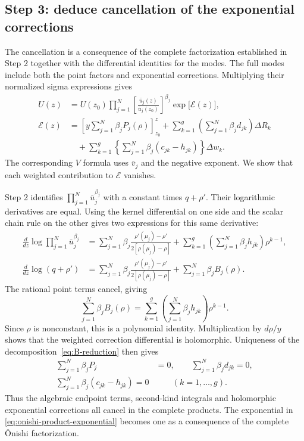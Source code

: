 \documentclass[11pt]{article}
\begin{document}
\subsection{Step 3: deduce cancellation of the exponential corrections}

The cancellation is a consequence of the complete factorization established in Step 2 together with the differential identities for the modes. The full modes include both the point factors and exponential corrections. Multiplying their normalized sigma expressions gives
\begin{equation}\label{eq:onishi-product-exponential}
\begin{aligned}
U(z)&=U(z_0)\prod_{j=1}^{N}\left[\frac{\bar u_j(z)}{\bar u_j(z_0)}\right]^{\beta_j}\exp\bigl[\mathcal E(z)\bigr],\\
\mathcal E(z)&=\left[y\sum_{j=1}^{N}\beta_jP_j(\rho)\right]_{z_0}^z
+\sum_{k=1}^g\left(\sum_{j=1}^{N}\beta_jd_{jk}\right)\Delta R_k\\
&\quad+\sum_{k=1}^g\left\{\sum_{j=1}^{N}\beta_j(c_{jk}-h_{jk})\right\}\Delta w_k.
\end{aligned}
\end{equation}
The corresponding $V$ formula uses $\bar v_j$ and the negative exponent. We show that each weighted contribution to $\mathcal E$ vanishes.

Step 2 identifies $\prod_{j=1}^{N}\bar u_j^{\beta_j}$ with a constant times $q+\rho'$. Their logarithmic derivatives are equal. Using the kernel differential on one side and the scalar chain rule on the other gives two expressions for this same derivative:
\[
\begin{aligned}
\frac{d}{dz}\log\prod_{j=1}^{N}\bar u_j^{\beta_j}
 &=\sum_{j=1}^{N}\beta_j\frac{\rho'(\mu_j)-\rho'}{2[\rho(\mu_j)-\rho]}
   +\sum_{k=1}^g\left(\sum_{j=1}^{N}\beta_jh_{jk}\right)\rho^{k-1},\\
\frac{d}{dz}\log(q+\rho')
 &=\sum_{j=1}^{N}\beta_j\frac{\rho'(\mu_j)-\rho'}{2[\rho(\mu_j)-\rho]}
   +\sum_{j=1}^{N}\beta_j B_j(\rho).
\end{aligned}
\]
The rational point terms cancel, giving
\[
\sum_{j=1}^{N}\beta_j B_j(\rho)
=\sum_{k=1}^g\left(\sum_{j=1}^{N}\beta_jh_{jk}\right)\rho^{k-1}.
\]
Since $\rho$ is nonconstant, this is a polynomial identity. Multiplication by $d\rho/y$ shows that the weighted correction differential is holomorphic. Uniqueness of the decomposition~\eqref{eq:B-reduction} then gives
\begin{equation}\label{eq:onishi-weighted-gauge}
\begin{aligned}
\sum_{j=1}^{N}\beta_jP_j&=0,\qquad
\sum_{j=1}^{N}\beta_jd_{jk}=0,\\
\sum_{j=1}^{N}\beta_j(c_{jk}-h_{jk})=0&\qquad(k=1,\ldots,g).
\end{aligned}
\end{equation}
Thus the algebraic endpoint terms, second-kind integrals and holomorphic exponential corrections all cancel in the complete products. The exponential in \eqref{eq:onishi-product-exponential} becomes one as a consequence of the complete \^Onishi factorization.
\end{document}
